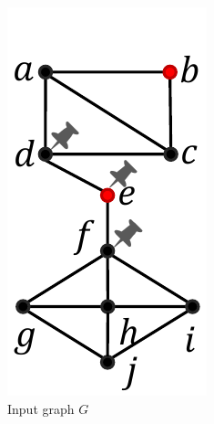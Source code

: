 \documentclass[sigconf]{acmart}
\begin{document}
\begin{figure}[h]
\vspace{-0.3cm}
\centering
\begin{subfigure}{.32\linewidth}
\centering
\includegraphics[width=0.7\linewidth]{figures/algorithm_1.pdf}
\vspace{-0.2cm}
\caption{Input graph $G$}
\label{fig:alg1}
\end{subfigure}
\begin{subfigure}{.32\linewidth}
\centering

\end{subfigure}
\end{figure}
\end{document}
